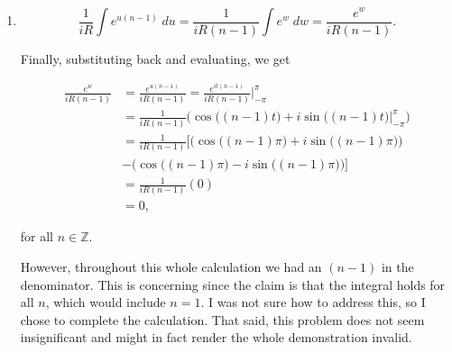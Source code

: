 \documentclass[12pt]{article}
\makeatletter
\theoremstyle{definition}
\theoremstyle{remark}
\newenvironment{solution}[1][\bf{\textit{Solution}}]{\par
  
  \normalfont \topsep6\p@\@plus6\p@\relax
  \list{}{\leftmargin=0mm
          \rightmargin=0mm
          \settowidth{\itemindent}{\itshape#1}%
          \labelwidth=\itemindent
          \parsep=0pt \listparindent=\parindent 
  }
  \item[\hskip\labelsep
        \itshape
    #1\@addpunct{.}]\ignorespaces
}{%
  \popQED\endlist\@endpefalse
}
\makeatother
\begin{document}
\begin{enumerate}[leftmargin=*]
\begin{solution}
\begin{enumerate}[label=(\alph*)]
            \begin{equation*}
                \frac{1}{iR}\int e^{u(n-1)}\;du = \frac{1}{iR(n-1)}\int e^w\;dw=\frac{e^w}{iR(n-1)}.
            \end{equation*}
            
            \noindent Finally, substituting back and evaluating, we get
            
            \begin{equation*}
                \begin{split}
                    \frac{e^w}{iR(n-1)} &= \frac{e^{u(n-1)}}{iR(n-1)} = \frac{e^{it(n-1)}}{iR(n-1)}\bigg\rvert_{-\pi}^{\pi} \\
                    &= \frac{1}{iR(n-1)}\bigg(\cos\big((n-1)t\big)+i\sin\big((n-1)t\big)\bigg\rvert_{-\pi}^{\pi}\bigg) \\
                    &= \frac{1}{iR(n-1)}\bigg[\bigg(\cos\big((n-1)\pi\big)+i\sin\big((n-1)\pi\big)\bigg) \\&-\bigg(\cos\big((n-1)\pi\big)-i\sin\big((n-1)\pi\big)\bigg)\bigg] \\
                    &=\frac{1}{iR(n-1)}(0) \\
                    &= 0,
                \end{split}
            \end{equation*}
            
            \noindent for all $n\in\mathbb{Z}$.\par\hspace{4mm} However, throughout this whole calculation we had an $(n-1)$ in the denominator. This is concerning since the claim is that the integral holds for all $n$, which would include $n=1$. I was not sure how to address this, so I chose to complete the calculation. That said, this problem does not seem insignificant and might in fact render the whole demonstration invalid. 
            
        \end{enumerate}
    \end{solution}

\end{enumerate}
\end{document}
